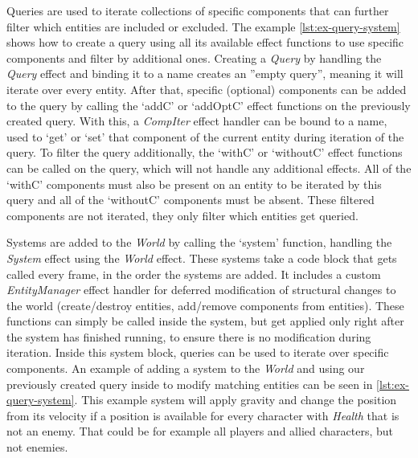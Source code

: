 Queries are used to iterate collections of specific components that can further filter which entities are included or excluded. The example \cref{lst:ex-query-system} shows how to create a query using all its available effect functions to use specific components and filter by additional ones. Creating a \textit{Query} by handling the \textit{Query} effect and binding it to a name creates an ''empty query'', meaning it will iterate over every entity. After that, specific (optional) components can be added to the query by calling the `addC' or `addOptC' effect functions on the previously created query. With this, a \textit{CompIter} effect handler can be bound to a name, used to `get' or `set' that component of the current entity during iteration of the query. To filter the query additionally, the `withC' or `withoutC' effect functions can be called on the query, which will not handle any additional effects. All of the `withC' components must also be present on an entity to be iterated by this query and all of the `withoutC' components must be absent. These filtered components are not iterated, they only filter which entities get queried.

Systems are added to the \textit{World} by calling the `system' function, handling the \textit{System} effect using the \textit{World} effect. These systems take a code block that gets called every frame, in the order the systems are added. It includes a custom \textit{EntityManager} effect handler for deferred modification of structural changes to the world (create/destroy entities, add/remove components from entities). These functions can simply be called inside the system, but get applied only right after the system has finished running, to ensure there is no modification during iteration. Inside this system block, queries can be used to iterate over specific components. An example of adding a system to the \textit{World} and using our previously created query inside to modify matching entities can be seen in \cref{lst:ex-query-system}. This example system will apply gravity and change the position from its velocity if a position is available for every character with \textit{Health} that is not an enemy. That could be for example all players and allied characters, but not enemies.
